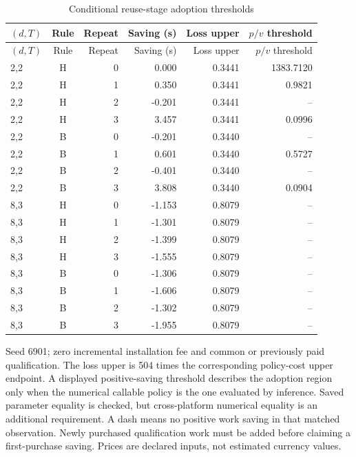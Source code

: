 \begingroup\small\setlength{\tabcolsep}{3pt}
\begin{longtable}{lcrrrr}
\caption{Conditional reuse-stage adoption thresholds}\label{tab:adoption70}\\
\hline
$(d,T)$ & Rule & Repeat & Saving (s) & Loss upper & $p/v$ threshold \\
\hline\endfirsthead
\hline
$(d,T)$ & Rule & Repeat & Saving (s) & Loss upper & $p/v$ threshold \\
\hline\endhead
2,2 & H & 0 & 0.000 & 0.3441 & 1383.7120 \\
2,2 & H & 1 & 0.350 & 0.3441 & 0.9821 \\
2,2 & H & 2 & -0.201 & 0.3441 & -- \\
2,2 & H & 3 & 3.457 & 0.3441 & 0.0996 \\
2,2 & B & 0 & -0.201 & 0.3440 & -- \\
2,2 & B & 1 & 0.601 & 0.3440 & 0.5727 \\
2,2 & B & 2 & -0.401 & 0.3440 & -- \\
2,2 & B & 3 & 3.808 & 0.3440 & 0.0904 \\
8,3 & H & 0 & -1.153 & 0.8079 & -- \\
8,3 & H & 1 & -1.301 & 0.8079 & -- \\
8,3 & H & 2 & -1.399 & 0.8079 & -- \\
8,3 & H & 3 & -1.555 & 0.8079 & -- \\
8,3 & B & 0 & -1.306 & 0.8079 & -- \\
8,3 & B & 1 & -1.606 & 0.8079 & -- \\
8,3 & B & 2 & -1.302 & 0.8079 & -- \\
8,3 & B & 3 & -1.955 & 0.8079 & -- \\
\hline
\end{longtable}\endgroup
{\footnotesize Seed 6901; zero incremental installation fee and common or previously paid qualification. The loss upper is 504 times the corresponding policy-cost upper endpoint. A displayed positive-saving threshold describes the adoption region only when the numerical callable policy is the one evaluated by inference. Saved parameter equality is checked, but cross-platform numerical equality is an additional requirement. A dash means no positive work saving in that matched observation. Newly purchased qualification work must be added before claiming a first-purchase saving. Prices are declared inputs, not estimated currency values.}\par
